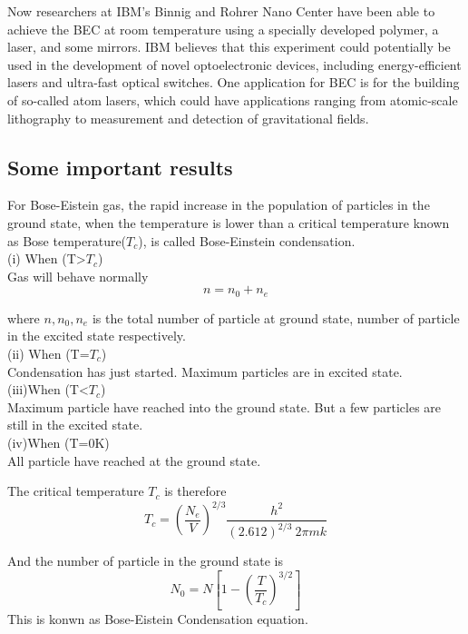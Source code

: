 \documentclass[12pt, letterpaper]{article}
\begin{document}
    Now researchers at IBM’s Binnig and Rohrer Nano Center have been able to achieve the BEC at room temperature using a 
    specially developed polymer, a laser, and some mirrors. IBM believes that this experiment could potentially be used in
    the development of novel optoelectronic devices, including energy-efficient lasers and ultra-fast optical switches. 
    One application for BEC is for the building of so-called atom lasers, which could have applications ranging from 
    atomic-scale lithography to measurement and detection of gravitational fields.  \\
    \subsection*{Some important results}
    For Bose-Eistein gas, the rapid increase in the population of particles in the ground state, when
    the temperature is lower than a critical temperature known as Bose temperature($T_{c}$), is called 
    Bose-Einstein condensation. \\ 
    
    (i) When (T>$T_{c}$)\\ 
    Gas will behave normally 
    \begin{equation}
        n = n_{0} + n_{e}
    \end{equation}

    where $n, n_{0}, n_{e}$ is the total number of particle at ground state, number of particle in the excited state
    respectively. \\ 

    (ii) When (T=$T_{c}$)\\  
    Condensation has just started. Maximum particles are in excited state. \\ 

    (iii)When (T<$T_{c}$)\\
    Maximum particle have reached into the ground state. But a few particles are still in the excited state. \\ 

    (iv)When (T=0K)\\
    All particle have reached at the ground state.

    The critical temperature $T_{c}$ is therefore
    \begin{equation}
        T_{c} = {\left(\frac{N_{e}}{V}\right)}^{2/3} \frac{h^{2}}{(2.612)^{2/3} \ 2\pi mk}
    \end{equation}

    And the number of particle in the ground state is 
    \begin{equation}
        N_{0} = N[1- \left(\frac{T}{T_c}\right)^{3/2}]
    \end{equation}
    This is konwn as Bose-Eistein Condensation equation.\\
\end{document}
